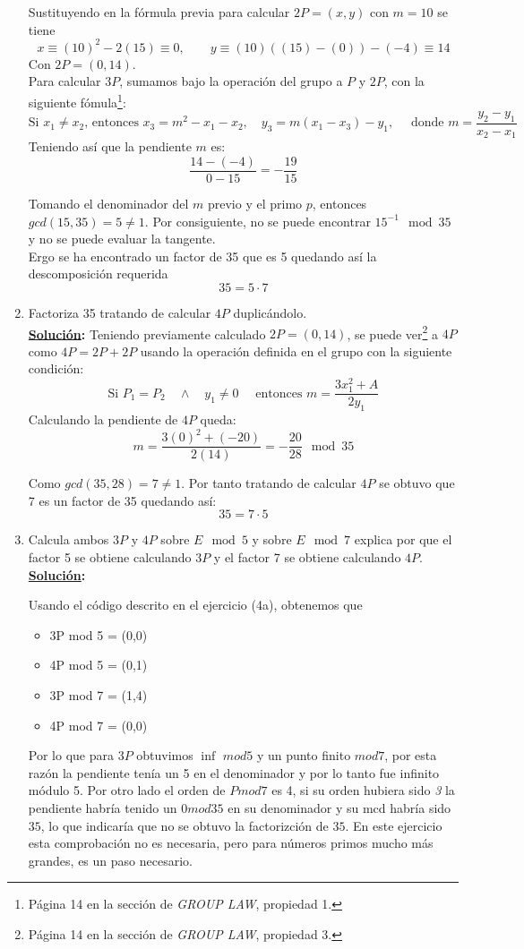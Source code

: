 \documentclass[11pt,letterpaper]{article}
\newcommand{\sol}{\textbf{\underline{Solución}: }} %
\begin{document}
\begin{enumerate}[label=(\roman*)]
    Sustituyendo en la fórmula previa para calcular $2P = (x,y)$ con $m=10$ se tiene
    $$x \equiv (10)^2 - 2(15) \equiv 0, \qquad y \equiv (10)((15)-(0)) - (-4) \equiv 14$$
    Con $2P = (0, 14)$.\\
    
    Para calcular $3P$, sumamos bajo la operación del grupo a $P$ y $2P$, con la siguiente 
    fómula\footnote{Página 14 en la sección de \textit{GROUP LAW}, propiedad 1.}:
    $$\text{Si } x_1 \neq x_2 \text{, entonces } x_3 = m^2 - x_1 -x_2, \quad y_3 = m(x_1 - x_3)-y_1,
    \quad \text{ donde } m = \frac{y_2 - y_1}{x_2 - x_1}$$
    Teniendo así que la pendiente $m$ es:
    $$\frac{14 - (-4)}{0 - 15} = -\frac{19}{15}$$
    
    Tomando el denominador del $m$ previo y el primo $p$, entonces $gcd(15, 35) = 5 \neq 1$. Por
    consiguiente, no se puede encontrar $15^{-1} \mod 35$ y no se puede evaluar la tangente.\\
    Ergo se ha encontrado un factor de 35 que es 5 quedando así la descomposición requerida
    $$35 = 5 \cdot 7$$


    \item Factoriza 35 tratando de calcular $4P$ duplicándolo.\\
    \sol Teniendo previamente calculado $2P = (0, 14)$, se puede 
    ver\footnote{Página 14 en la sección de \textit{GROUP LAW}, propiedad 3.} a $4P$ como $4P = 2P + 2P$
    usando la operación definida en el grupo con la siguiente condición:
    $$\text{Si } P_1 = P_2 \quad \land \quad y_1 \neq 0 \quad \text{ entonces } m= \frac{3x_1^2+A}{2y_1}$$
    Calculando la pendiente de $4P$ queda:
    $$m = \frac{3(0)^2 + (-20)}{2(14)} = -\frac{20}{28} \mod{35}$$
    
    Como $gcd(35, 28) = 7 \neq 1$. Por tanto tratando de calcular $4P$ se obtuvo que 7 es un factor de
    35 quedando así:
    $$35 = 7 \cdot 5$$
    

    \item Calcula ambos $3P$ y $4P$ sobre $E \mod{5}$ y sobre $E \mod{7}$ explica por que el
    factor 5 se obtiene calculando $3P$ y el factor 7 se obtiene calculando $4P$.\\
    \sol 
    
    Usando el código descrito en el ejercicio (4a), obtenemos que
    \begin{itemize}
        \item 3P mod 5 = (0,0)
        \item 4P mod 5 = (0,1)
        \item 3P mod 7 = (1,4)
        \item 4P mod 7 = (0,0)
    \end{itemize}
    Por lo que para $3P$ obtuvimos $\inf$ $mod 5$ y un punto finito $mod 7$, por esta razón la pendiente tenía un 5 en el denominador y por lo tanto fue infinito módulo 5. Por otro lado el orden de $P mod 7$ es 4, si su orden hubiera sido \textit{3} la pendiente habría tenido un $0 mod 35$ en su denominador y su mcd habría sido $35$, lo que indicaría que no se obtuvo la factorizción de $35$. En este ejercicio esta comprobación no es necesaria, pero para números primos mucho más grandes, es un paso necesario.


\end{enumerate}
\end{document}
